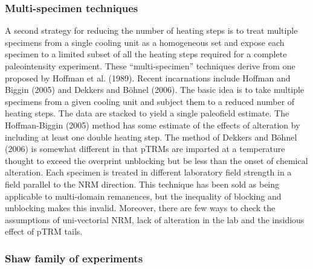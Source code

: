  \subsubsection{Multi-specimen techniques}
 
A second strategy for reducing the number of heating steps is to treat multiple specimens from a single cooling unit as a homogeneous set and expose each specimen to a limited subset of all the heating steps required for a complete paleointensity experiment.   These ``multi-specimen'' techniques derive from one proposed by 
Hoffman  et al. (1989). \nocite{hoffman89}  Recent incarnations include  Hoffman and 
Biggin (2005) and   
Dekkers and B\"ohnel (2006).  \nocite{hoffman05,dekkers06}  The basic idea is to take multiple  specimens from a given cooling unit and subject them to a reduced number of heating steps.    The data are stacked to yield a single paleofield estimate.  The Hoffman-Biggin (2005) method has some estimate of the effects of alteration by including at least one double heating step.  The method of Dekkers and B\"ohnel (2006) is somewhat different in that pTRMs are imparted at a temperature thought to exceed the overprint unblocking but be less than the onset of chemical alteration.  Each specimen is treated in different laboratory field strength in  a field parallel to the NRM direction.    This technique has been sold as being applicable to multi-domain remanences, but the inequality of blocking and unblocking makes this invalid.   Moreover, there are few ways to check the assumptions of uni-vectorial NRM, lack of alteration in the lab and the insidious effect of pTRM tails.   



\subsubsection{Shaw family of experiments}
\label{sect:shaw}


